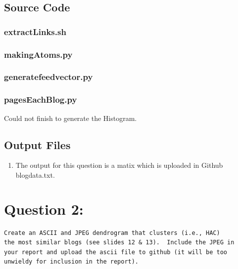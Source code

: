 \documentclass[12pt]{article}
\begin{document}
\newpage
\subsection{Source Code}
\subsubsection{extractLinks.sh}

\subsubsection{makingAtoms.py}

\newpage
\subsubsection{generatefeedvector.py}

\subsubsection{pagesEachBlog.py}
Could not finish  to generate the Histogram.


\subsection{Output Files}
\begin{enumerate}
    \item The output for this question is a matix which is uploaded in Github blogdata.txt.
\end{enumerate}
\newpage
\section{Question 2:}
\begin{verbatim}
Create an ASCII and JPEG dendrogram that clusters (i.e., HAC)
the most similar blogs (see slides 12 & 13).  Include the JPEG in
your report and upload the ascii file to github (it will be too
unwieldy for inclusion in the report).
\end{verbatim}
\end{document}
